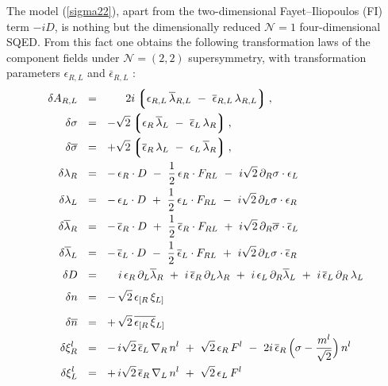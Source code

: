 \documentclass[12pt]{article}
\newcommand{\ntwot}{${\mathcal N}= \left(2,2\right) $ }
\newcommand{\none}{${\mathcal N}=1$ }
\newcommand{\p}{\partial}
\newcommand{\ov}{\overline}
\newcommand{\lgr}{\left\lgroup}
\newcommand{\rgr}{\right\rgroup}
\newcommand{\lar}{\lambda_R}
\newcommand{\lal}{\lambda_L}
\newcommand{\larl}{\lambda_{R,L}}
\newcommand{\blar}{\ov{\lambda}{}_R}
\newcommand{\blal}{\ov{\lambda}{}_L}
\newcommand{\blarl}{\ov{\lambda}{}_{R,L}}
\newcommand{\eer}{\epsilon_R}
\newcommand{\eel}{\epsilon_L}
\newcommand{\eerl}{\epsilon_{R,L}}
\newcommand{\beer}{\ov{\epsilon}{}_R}
\newcommand{\beel}{\ov{\epsilon}{}_L}
\newcommand{\beerl}{\ov{\epsilon}{}_{R,L}}
\begin{document}
     The model (\ref{sigma22}),
      apart from the two-dimensional Fayet--Iliopoulos (FI) term $ - i D $, is nothing but
        the dimensionally reduced \none four-dimensional SQED.
        From this fact one obtains the following transformation laws of the component fields under 
        \ntwot supersymmetry, with transformation parameters $\epsilon_{R,L}$ and 
      $\bar{\epsilon}_{R,L}$  :
\begin{align}
%
\notag
  \delta A_{R,L} & ~~=~~ ~~~~~ 2i \lgr  \eerl\, \blarl
                              ~-~ \beerl\, \larl \rgr  , \\
%
\notag
  \delta\sigma & ~~=~~ -\sqrt{2}
                              \lgr \eer\, \blal ~-~ \beel\,\lar \rgr , 
                              \\
%
\notag
  \delta\ov{\sigma} & ~~=~~ +\sqrt{2}
                              \lgr \beer\,\lal ~-~ \eel\,\blar \rgr ,
                              \\
%
\notag
  \delta\lar & ~~=~~ -\,\eer\cdot D ~-~ \frac{1}{2}\,\eer\cdot F_{RL} 
                     ~-~ i\sqrt{2}\, \p_R\sigma \cdot \eel
                     \\
%
\notag
  \delta\lal & ~~=~~ -\,\eel\cdot D ~+~ \frac{1}{2}\,\eel\cdot F_{RL} 
                     ~-~ i\sqrt{2}\, \p_L\sigma \cdot \eer
                     \\
%
\notag
  \delta\blar & ~~=~~ -\,\beer\cdot D ~+~ \frac{1}{2}\,\beer\cdot F_{RL} 
                     ~+~ i\sqrt{2}\, \p_R\ov{\sigma} \cdot \beel
                     \\
%
\notag
  \delta\blal & ~~=~~ -\,\beel\cdot D ~-~ \frac{1}{2}\,\beel\cdot F_{RL}
                     ~+~ i\sqrt{2}\, \p_L\sigma \cdot \beer
                     \\
%
\notag
  \delta D & ~~=~~ ~~~i\,\eer\, \p_L \blar ~+~ i\,\beer\, \p_L\lar 
                   ~+~ i\,\eel\, \p_R \blal ~+~ i\,\beel\,\p_R\,\lal
                   \\[1mm]
%
\label{msusy}
  \delta n & ~~=~~ -\,\sqrt{2}\, \epsilon_{[R}\, \xi_{L]} 
                   \\[2mm]
%
\notag
  \delta\ov{n} & ~~=~~ +\,\sqrt{2}\,\ov{\epsilon_{[R}\, \xi}{}_{L]}
                   \\
%
\notag
  \delta\xi_R^l & ~~=~~
     -\, i\sqrt{2}\, \beel\, \nabla_R\, n^l ~+~ \sqrt{2}\, \eer\, F^l 
     ~-~ 2i\, \beer\, \Bigl(\sigma - \frac{m^l}{\sqrt{2}}\Bigr)\, n^l
     \\
%
\notag
  \delta\xi_L^l & ~~=~~
     +\, i\sqrt{2}\, \beer\, \nabla_L\, n^l ~+~ \sqrt{2}\, \eel\, F^l

\end{align}
\end{document}
